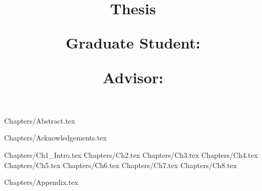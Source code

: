 \documentclass[
    12pt,
    a4paper,
    onecolumn,
    ]{report}
\title{
    \textbf {\UNIVERSITY}

    \vspace {1cm}
    \large  {\DEPARTMENT}
    
    \large  {\DEGREE Thesis}

    \vspace {5cm}
    \textbf {\Large {\TITLE}}

    \vfill
    Graduate Student: \AUTHOR

    Advisor: \ADVISOR

}
\author{}
\begin{document}
\maketitle			    %

\newpage
 {Chapters/Abstract.tex}
    
\newpage
 {Chapters/Acknowledgements.tex}

\renewcommand\contentsname{\Large\centering Table of Contents}
\renewcommand\listfigurename{\Large\centering List of Figures}
\renewcommand\listtablename{\Large\centering List of Tables}
\tableofcontents    %
\listoffigures      %
\listoftables       %

\newpage
{}  %
\setcounter{page}{1}    %

\begin{linenumbers}     %
 {Chapters/Ch1_Intro.tex}
 {Chapters/Ch2.tex}
 {Chapters/Ch3.tex}
 {Chapters/Ch4.tex}
 {Chapters/Ch5.tex}
 {Chapters/Ch6.tex}
 {Chapters/Ch7.tex}
 {Chapters/Ch8.tex}

\end{linenumbers}       %
  



 {Chapters/Appendix.tex}
\end{document}
